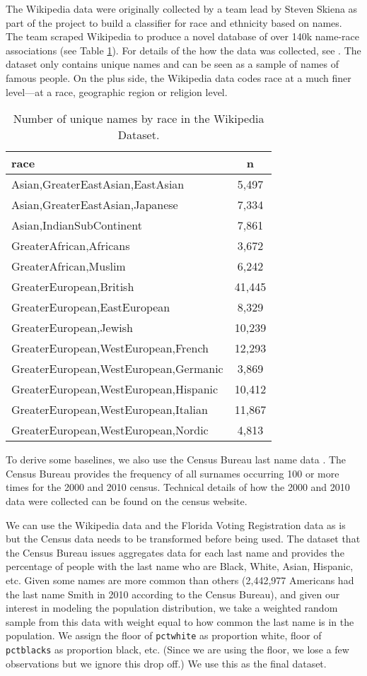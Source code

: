 \documentclass[12pt, letterpaper]{article}
\begin{document}
The Wikipedia data were originally collected by a team lead by Steven Skiena as part of the project to build a classifier for race and ethnicity based on names. The team scraped Wikipedia to produce a novel database of over 140k name-race associations (see Table \ref{table:wikipedia_data}). For details of the how the data was collected, see \citet{ambekar2009name}. The dataset only contains unique names and can be seen as a sample of names of famous people. On the plus side, the Wikipedia data codes race at a much finer level---at a race, geographic region or religion level. 

\begin{table}[h!]
\centering
\caption{Number of unique names by race in the Wikipedia Dataset.}
\begin{tabular}{ l c }
\hline    
race & n \\
\hline
Asian,GreaterEastAsian,EastAsian & 5,497 \\
Asian,GreaterEastAsian,Japanese & 7,334 \\
Asian,IndianSubContinent & 7,861 \\
GreaterAfrican,Africans & 3,672 \\
GreaterAfrican,Muslim & 6,242 \\
GreaterEuropean,British & 41,445 \\
GreaterEuropean,EastEuropean & 8,329 \\
GreaterEuropean,Jewish & 10,239 \\
GreaterEuropean,WestEuropean,French & 12,293 \\
GreaterEuropean,WestEuropean,Germanic & 3,869 \\
GreaterEuropean,WestEuropean,Hispanic & 10,412 \\
GreaterEuropean,WestEuropean,Italian & 11,867 \\
GreaterEuropean,WestEuropean,Nordic & 4,813 \\
\hline
\end{tabular}
\label{table:wikipedia_data}
\end{table}

To derive some baselines, we also use the Census Bureau last name data \citep{census2010}. The Census Bureau provides the frequency of all surnames occurring 100 or more times for the 2000 and 2010 census. Technical details of how the 2000 and 2010 data were collected can be found on the census website. 

We can use the Wikipedia data and the Florida Voting Registration data as is but the Census data needs to be transformed before being used. The dataset that the Census Bureau issues aggregates data for each last name and provides the percentage of people with the last name who are Black, White, Asian, Hispanic, etc. Given some names are more common than others (2,442,977 Americans had the last name Smith in 2010 according to the Census Bureau), and given our interest in modeling the population distribution, we take a weighted random sample from this data with weight equal to how common the last name is in the population. We assign the floor of \texttt{pctwhite} as proportion white, floor of \texttt{pctblacks} as proportion black, etc. (Since we are using the floor, we lose a few observations but we ignore this drop off.) We use this as the final dataset.
\end{document}
